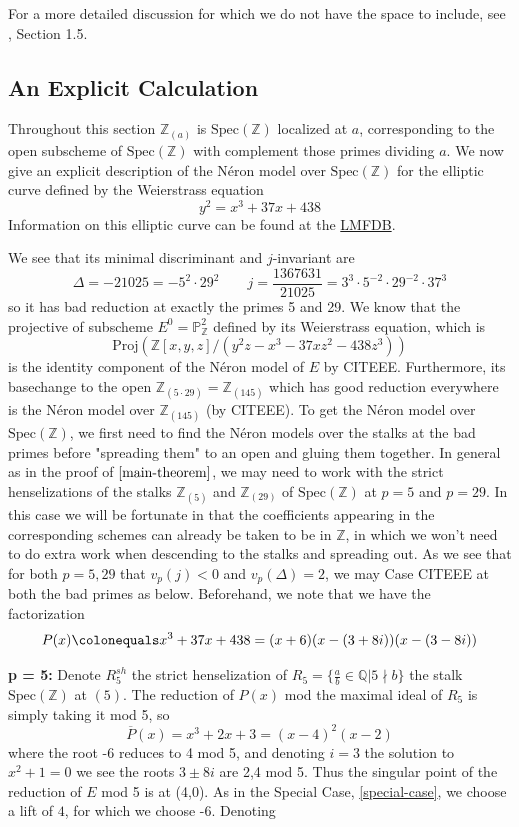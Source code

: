 \documentclass{article}
\theoremstyle{definition}
\theoremstyle{remark}
\theoremstyle{plain}
\newcommand{\Z}{\mathbb{Z}}
\newcommand{\Q}{\mathbb{Q}}
\newcommand{\mb}[1]{\mathbb{#1}}
\begin{document}
For a more detailed discussion for which we do not have the space to include, see \cite{BLR}, Section 1.5.

\subsection{An Explicit Calculation}




Throughout this section $\Z_{(a)}$ is $\text{Spec}(\Z)$ localized at $a$, corresponding to the open subscheme of $\text{Spec}(\Z)$ with complement those primes dividing $a$.
We now give an explicit description of the N\'eron model over $\text{Spec}(\Z)$ for the elliptic curve defined by the Weierstrass equation
\[y^2 = x^3 + 37x + 438\]
Information on this elliptic curve can be found at the \href{https://www.lmfdb.org/EllipticCurve/Q/145/a/2}{LMFDB}. \newline

We see that its minimal discriminant and $j$-invariant are 
\[\Delta = -21025 = -5^2\cdot 29^2 \quad \quad j = \frac{1367631}{21025} = 3^3 \cdot 5^{-2} \cdot 29^{-2} \cdot 37^3\]
so it has bad reduction at exactly the primes 5 and 29.
We know that the projective of subscheme $E^0 = \mb{P}_{\Z}^2$ defined by its Weierstrass equation, which is 
\[\text{Proj}(\Z[x,y,z]/(y^2z - x^3 -37xz^2 - 438z^3))\]
is the identity component of the N\'eron model of $E$ by CITEEE.
Furthermore, its basechange to the open $\Z_{(5 \cdot 29)} = \Z_{(145)}$ which has good reduction everywhere is the N\'eron model over $\Z_{(145)}$ (by CITEEE).
To get the N\'eron model over $\text{Spec}(\Z)$, we first need to find the N\'eron models over the stalks at the bad primes before "spreading them" to an open and gluing them together.
In general as in the proof of $\cite{main-theorem}$, we may need to work with the strict henselizations of the stalks $\Z_{(5)}$  and $\Z_{(29)}$ of $\text{Spec}(\Z)$ at $p=5$ and $p=29$.
In this case we will be fortunate in that the coefficients appearing in the corresponding schemes can already be taken to be in $\Z$, in which we won't need to do extra work when descending to the stalks and spreading out.
As we see that for both $p = 5,29$ that $v_p(j) < 0$ and $v_p(\Delta) = 2$, we may Case CITEEE at both the bad primes as below. \newline
Beforehand, we note that we have the factorization 
\[P(x) \colonequals x^3 +37x + 438 = (x+6)(x - (3 + 8i))(x - (3 - 8i))\]

\noindent \textbf{p = 5:} Denote $R_5^{sh}$ the strict henselization of $R_5 = \{ \frac{a}{b} \in \Q| 5 \nmid b\}$ the stalk $\text{Spec}(\Z)$ at $(5)$. 
The reduction of $P(x)$ mod the maximal ideal of $R_5$ is simply taking it mod 5, so 
\[\overline{P}(x) = x^3 +2x +3 = (x-4)^2(x-2)\]
where the root -6 reduces to 4 mod 5, and denoting $i = 3$ the solution to $x^2 + 1 = 0$ we see the roots $3 \pm 8i$ are 2,4 mod 5.
Thus the singular point of the reduction of $E$ mod 5 is at (4,0).
As in the Special Case, \ref{special-case}, we choose a lift of $4$, for which we choose -6.
Denoting 
\end{document}
